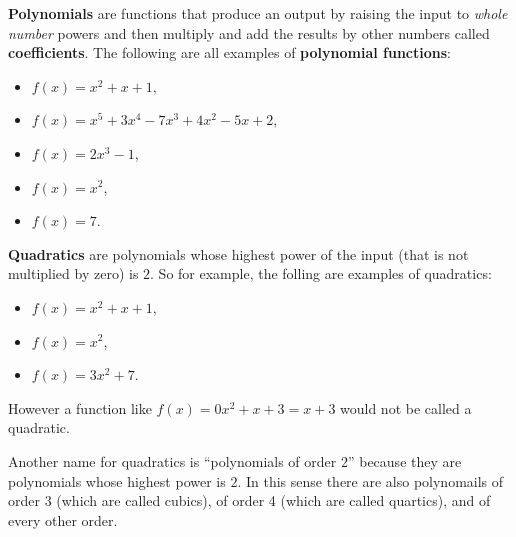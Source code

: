 \documentclass[12pt]{article}
\begin{document}
\textbf{Polynomials} are functions that produce an output by raising the input to \emph{whole number} powers and then multiply and add the results by other numbers called \textbf{coefficients}. The following are all examples of \textbf{polynomial functions}:

\begin{itemize}
  \item $f(x) = x^2 + x + 1$,
  \item $f(x) = x^5 + 3x^4 - 7x^3 + 4x^2 - 5x + 2$,
  \item $f(x) = 2x^3 - 1$,
  \item $f(x) = x^2$,
  \item $f(x) = 7$. 
\end{itemize}

\vspace{0.2cm}\vspace{0.2cm}

\textbf{Quadratics} are polynomials whose highest power of the input (that is not multiplied by zero) is $2$. So for example, the folling are examples of quadratics:

\begin{itemize}
  \item $f(x) = x^2 + x + 1$,
  \item $f(x) = x^2$,
  \item $f(x) = 3x^2 + 7$.
\end{itemize}

However a function like $f(x) = 0x^2 + x + 3 = x + 3$ would not be called a quadratic.

Another name for quadratics is ``polynomials of order $2$'' because they are polynomials whose highest power is $2$. In this sense there are also polynomails of order $3$ (which are called cubics), of order 4 (which are called quartics), and of every other order. 

\vspace{0.2cm}\vspace{0.2cm}

% 
\end{document}
